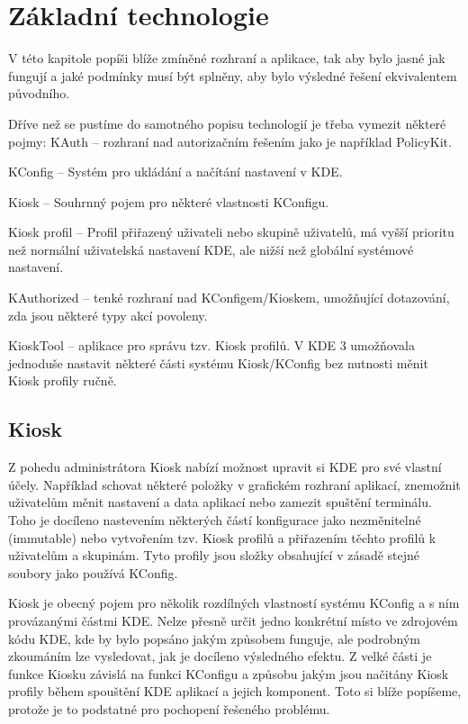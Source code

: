 \chapter{Základní technologie}
V této kapitole popíši blíže zmíněné rozhraní a aplikace, tak aby bylo jasné jak fungují
a jaké podmínky musí být splněny, aby bylo výsledné řešení ekvivalentem původního.

Dříve než se pustíme do samotného popisu technologií je třeba vymezit některé pojmy:
KAuth -- rozhraní nad autorizačním řešením jako je například PolicyKit.

KConfig -- Systém pro ukládání a načítání nastavení v KDE.

Kiosk -- Souhrnný pojem pro některé vlastnosti KConfigu.

Kiosk profil -- Profil přiřazený uživateli nebo skupině uživatelů, má vyšší prioritu
než normální uživatelská nastavení KDE, ale nižší než globální systémové nastavení.

KAuthorized -- tenké rozhraní nad KConfigem/Kioskem, umožňující dotazování, zda
jsou některé typy akcí povoleny.

KioskTool -- aplikace pro správu tzv. Kiosk profilů. V KDE 3 umožňovala jednoduše
nastavit některé části systému Kiosk/KConfig bez nutnosti měnit Kiosk profily ručně.

\section{Kiosk}
Z pohedu administrátora Kiosk nabízí možnost upravit si KDE pro své vlastní
účely. Například schovat některé položky v grafickém rozhraní aplikací,
znemožnit uživatelům měnit nastavení a data aplikací nebo zamezit spuštění
terminálu. Toho je docíleno nastevením některých částí konfigurace jako
nezměnitelné (immutable) nebo vytvořením tzv. Kiosk profilů a přiřazením těchto
profilů k uživatelům a skupinám. Tyto profily jsou složky obsahující v zásadě
stejné soubory jako používá KConfig.

Kiosk je obecný pojem pro několik rozdílných vlastností systému KConfig a s ním
provázanými částmi KDE. Nelze přesně určit jedno konkrétní místo ve zdrojovém kódu
KDE, kde by bylo popsáno jakým způsobem funguje, ale podrobným zkoumáním lze vysledovat,
jak je docíleno výsledného efektu. Z velké části je funkce Kiosku závislá na funkci
KConfigu a způsobu jakým jsou načitány Kiosk profily během spouštění KDE aplikací
a jejich komponent. Toto si blíže popíšeme, protože je to podstatné pro pochopení
řešeného problému.


